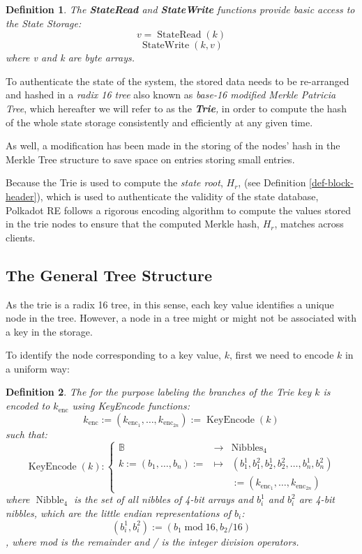 \documentclass{article}
\newcommand{\assign}{:=}
\newcommand{\nosymbol}{}
\newcommand{\tmem}[1]{{\em #1\/}}
\newcommand{\tmop}[1]{\ensuremath{\operatorname{#1}}}
\newcommand{\tmstrong}[1]{\textbf{#1}}
\newcommand{\tmtextbf}[1]{{\bfseries{#1}}}
\newcommand{\tmtextit}[1]{{\itshape{#1}}}
\newtheorem{definition}{Definition}
\providecommand{\nosymbol}{}
\providecommand{\tmem}[1]{\tmtextit{#1}}
\providecommand{\tmop}[1]{\ensuremath{\mathrm{#1}}}
\providecommand{\tmstrong}[1]{\tmtextbf{#1}}
\providecommand{\tmtextbf}[1]{\tmtextbf{#1}}
\providecommand{\tmtextit}[1]{\tmtextit{#1}}
\newtheorem{definition}{Definition}
\begin{document}
\begin{definition}
  \label{def-state-read-write} The {\tmstrong{StateRead}} and
  {\tmstrong{StateWrite}} functions provide basic access to the State Storage:
  \[ v = \tmop{StateRead} (k) \]
  \[ \tmop{StateWrite} (k, v) \]
  where v and k are byte arrays.
\end{definition}

To authenticate the state of the system, the stored data needs to be
re-arranged and hashed in a {\tmem{radix 16 tree}} also known as
{\tmem{base-16 modified Merkle Patricia Tree}}, which hereafter we will refer
to as the {\tmem{{\tmstrong{Trie}},}} in order to compute the hash of the
whole state storage consistently and efficiently at any given time.

As well, a modification has been made in the storing of the nodes' hash in
the Merkle Tree structure to save space on entries storing small entries.

Because the Trie is used to compute the {\tmem{state root}}, $H_r$, (see
Definition \ref{def-block-header}), which is used to authenticate the validity
of the state database, Polkadot RE follows a rigorous encoding algorithm to
compute the values stored in the trie nodes to ensure that the computed Merkle
hash, $H_r$, matches across clients.

\subsection{The General Tree Structure}

As the trie is a radix 16 tree, in this sense, each key value identifies a
unique node in the tree. However, a node in a tree might or might not be
associated with a key in the storage.

To identify the node corresponding to a key value, $k$, first we need to
encode $k$ in a uniform way:

\begin{definition}
  The for the purpose labeling the branches of the Trie key $k$ is encoded to
  $k_{\tmop{enc}}$ using KeyEncode functions:
  \begin{equation}
    k_{\tmop{enc}} \assign (k_{\tmop{enc}_1}, \ldots, k_{\tmop{enc}_{2 n}})
    \assign \tmop{KeyEncode} (k) \label{key-encode-in-trie}
  \end{equation}
  such that:
  \[ \tmop{KeyEncode} (k) : \left\{ \begin{array}{lll}
       \mathbb{B}^{\nosymbol} & \rightarrow & \tmop{Nibbles}_4\\
       k \assign (b_1, \ldots, b_n) \assign & \mapsto & (b^1_1, b^2_1, b_2^1,
       b^2_2, \ldots, b^1_n, b^2_n)\\
       &  & \assign (k_{\tmop{enc}_1}, \ldots, k_{\tmop{enc}_{2 n}})
     \end{array} \right. \]
  where $\tmop{Nibble}_4$ is the set of all nibbles of 4-bit arrays and
  $b^1_i$ and $b^2_i$ are 4-bit nibbles, which are the little endian
  representations of $b_i$:
  \[ (b^1_i, b^2_i) \assign (b_1 \tmop{mod} 16, b_2 / 16) \]
  , where mod is the remainder and / is the integer division operators.
\end{definition}
\end{document}
